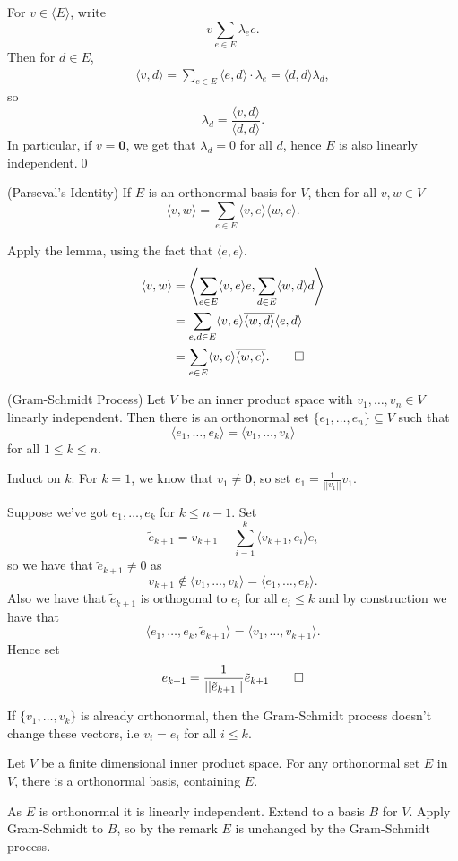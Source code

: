 \documentclass{article}
\begin{document}
\pf For $ v\in \langle E\rangle $, write
\[ v\sum_{e\in E}\lambda_e e. \]
Then for $ d\in E $,
\begin{align*}
	\langle v,d\rangle=\sum_{e\in E}\langle e,d\rangle\cdot \lambda_e=\langle d,d\rangle\lambda_d,
\end{align*}
so
\[
	\lambda_d=\frac{\langle v,d\rangle}{\langle d,d\rangle}.
\]
In particular, if $ v=\mathbf 0 $, we get that $ \lambda_d=0 $ for all $ d $, hence $ E $ is also linearly independent.\qed
\begin{corollary}
	(Parseval's Identity) If $ E $ is an orthonormal basis for $ V $, then for all $ v,w\in V $
	\[
		\langle v,w\rangle=\sum_{e\in E}\langle v,e\rangle\overline{\langle w,e\rangle}.
	\]
\end{corollary}
\pf Apply the lemma, using the fact that $ \langle e,e\rangle $.
\begin{align*}
	\langle v,w\rangle &=\left\langle\sum_{e\in E}\langle v,e\rangle e,\sum_{d\in E}\langle w,d\rangle d\right\rangle\\
			   &=\sum_{e,d\in E}\langle v,e\rangle\overline{\langle w,d\rangle}\langle e,d\rangle\\
			   &=\sum_{e\in E}\langle v,e\rangle\overline{\langle w,e\rangle}.\qed
\end{align*}
\begin{theorem}
	(Gram-Schmidt Process) Let $ V $ be an inner product space with $ v_1,\dots, v_n\in V $ linearly independent. Then there is an orthonormal set $ \{e_1,\dots, e_n\} \subseteq V $ such that
	\[
	  \langle e_1,\dots, e_k\rangle=\langle v_1,\dots ,v_k\rangle
	\]
	for all $ 1\le k\le n $.
\end{theorem}
\pf Induct on $ k $. For $ k=1 $, we know that $ v_1\ne \mathbf 0 $, so set $ e_1=\frac 1{||v_1||}v_1 $.\par
Suppose we've got $ e_1,\dots, e_k $ for $ k\le n-1 $. Set
\[
	\tilde e_{k+1}=v_{k+1}-\sum_{i=1}^k\langle v_{k+1},e_i\rangle e_i
\]
so we have that $ \tilde e_{k+1}\ne 0 $ as
\[
	v_{k+1}\notin \langle v_1,\dots, v_k\rangle=\langle e_1, \dots, e_k\rangle.
\]
Also we have that $ \tilde e_{k+1} $ is orthogonal to $ e_i $ for all $ e_i\le k $ and by construction we have that
\[
	\langle e_1,\dots, e_k,\tilde e_{k+1}\rangle = \langle v_1,\dots, v_{k+1}\rangle.
\]
Hence set
\[
	e_{k+1}=\frac 1{||\tilde e_{k+1}||}\tilde e_{k+1}\qed
\]
\begin{remark}
	If $ \{v_1,\dots, v_k\} $ is already orthonormal, then the Gram-Schmidt process doesn't change these vectors, i.e $ v_i=e_i $ for all $ i\le k $.
\end{remark}
\begin{corollary}
  Let $ V $ be a finite dimensional inner product space. For any orthonormal set $ E $ in $ V $, there is a orthonormal basis, containing $ E $.
\end{corollary}
\pf As $ E $ is orthonormal it is linearly independent. Extend to a basis $ B $ for $ V $. Apply Gram-Schmidt to $ B $, so by the remark $ E $ is unchanged by the Gram-Schmidt process. 
\end{document}
